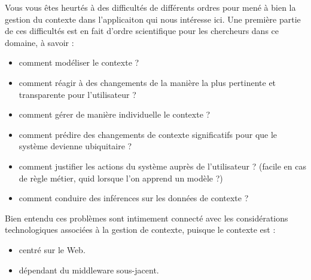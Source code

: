 \documentclass[a4paper,11pt,fleqn]{article}
\begin{document}
Vous vous êtes heurtés à des difficultés de différents ordres pour mené à bien la gestion du contexte dans l'applicaiton qui nous intéresse ici. Une première partie de ces difficultés est en fait d'ordre scientifique pour les chercheurs dans ce domaine, à savoir :
\begin{itemize}
	\item comment modéliser le contexte ?
	\item comment réagir à des changements de la manière la plus pertinente et transparente pour l'utilisateur ?
	\item comment gérer de manière individuelle le contexte ?
	\item comment prédire des changements de contexte significatifs pour que le système devienne ubiquitaire ?
	\item comment justifier les actions du système auprès de l'utilisateur ? (facile en cas de règle métier, quid lorsque l'on apprend un modèle ?)
	\item comment conduire des inférences sur les données de contexte ?
\end{itemize}

Bien entendu ces problèmes sont intimement connecté avec les considérations technologiques associées à la gestion de contexte, puisque le contexte est :
\begin{itemize}
	\item centré sur le Web.
	\item dépendant du middleware sous-jacent.
\end{itemize}
\end{document}
